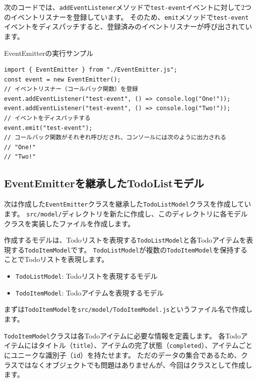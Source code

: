 次のコードでは、\texttt{addEventListener}メソッドで\texttt{test-event}イベントに対して2つのイベントリスナーを登録しています。
そのため、\texttt{emit}メソッドで\texttt{test-event}イベントをディスパッチすると、登録済みのイベントリスナーが呼び出されています。

\begin{listtitle}
EventEmitterの実行サンプル
\end{listtitle}
\begin{lstlisting}
import { EventEmitter } from "./EventEmitter.js";
const event = new EventEmitter();
// イベントリスナー（コールバック関数）を登録
event.addEventListener("test-event", () => console.log("One!"));
event.addEventListener("test-event", () => console.log("Two!"));
// イベントをディスパッチする
event.emit("test-event");
// コールバック関数がそれぞれ呼びだされ、コンソールには次のように出力される
// "One!"
// "Two!"
\end{lstlisting}
\listend

\hypertarget{event-emitter-todolist-model}{%
\subsection{EventEmitterを継承したTodoListモデル}\label{event-emitter-todolist-model}}

次は作成した\texttt{EventEmitter}クラスを継承した\texttt{TodoListModel}クラスを作成しています。
\texttt{src/model/}ディレクトリを新たに作成し、このディレクトリに各モデルクラスを実装したファイルを作成します。

作成するモデルは、Todoリストを表現する\texttt{TodoListModel}と各Todoアイテムを表現する\texttt{TodoItemModel}です。
\texttt{TodoListModel}が複数の\texttt{TodoItemModel}を保持することでTodoリストを表現します。

\begin{itemize}
\item
  \texttt{TodoListModel}: Todoリストを表現するモデル
\item
  \texttt{TodoItemModel}: Todoアイテムを表現するモデル
\end{itemize}

まずは\texttt{TodoItemModel}を\texttt{src/model/TodoItemModel.js}というファイル名で作成します。

\texttt{TodoItemModel}クラスは各Todoアイテムに必要な情報を定義します。
各Todoアイテムにはタイトル（\texttt{title}）、アイテムの完了状態（\texttt{completed}）、アイテムごとにユニークな識別子（\texttt{id}）を持たせます。
ただのデータの集合であるため、クラスではなくオブジェクトでも問題はありませんが、今回はクラスとして作成します。

